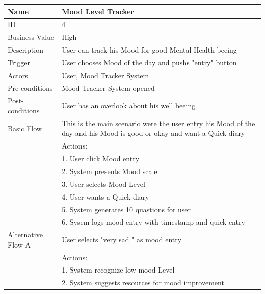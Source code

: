 \documentclass{article}
\begin{document}
\begin{table}[h!]
    \begin{tabularx}{\textwidth}{|>{\raggedright\arraybackslash}p{}|X|}
        \hline
        Name             & Mood Level Tracker                               \\ \hline
        ID               & 4                                                                                      \\ \hline
        Business Value   & High                                                                                   \\ \hline
        Description      & User can track his Mood for good Mental Health beeing  \\ \hline
        Trigger          & User chooses Mood of the day and pushs "entry" button \\ \hline
        Actors           & User, Mood Tracker System                               \\ \hline
        Pre-conditions   & Mood Tracker System opened                                   \\ \hline
        Post-conditions  & User has an overlook about his well beeing                                                       \\ \hline
        Basic Flow       & This is the main scenario were the user entry his Mood of the day and his Mood is good or okay and want a Quick diary \\ \hline
                         & Actions: \\
                         & 1. User click Mood entry\\
                         & 2. System presents Mood scale \\
                         & 3. User selects Mood Level \\
                         & 4. User wants a Quick diary \\
                         & 5. System generates 10 quastions for user \\
                         & 6. Sysem logs mood entry with timestamp and quick entry\\ \hline
        Alternative Flow A & User selects "very sad " as mood entry \\
                         & Actions: \\
                         & 1. System recognize low mood Level \\
                         & 2. System suggests resources for mood improvement \\

\end{tabularx}
\end{table}
\end{document}

